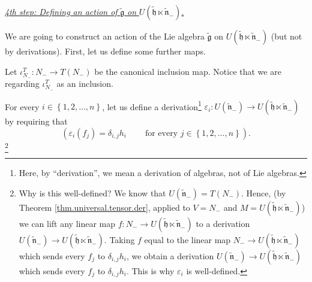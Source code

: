 \documentclass[etingof-lie.tex]{subfiles}
\begin{document}
\bigskip

\underline{\textit{4th step: Defining an action of }$\widetilde{\mathfrak{g}}$
\textit{on }$U\left(  \widetilde{\mathfrak{h}}\ltimes\widetilde{\mathfrak{n}%
}_{-}\right)  $\textit{.}}

We are going to construct an action of the Lie algebra
$\widetilde{\mathfrak{g}}$ on $U\left(  \widetilde{\mathfrak{h}}%
\ltimes\widetilde{\mathfrak{n}}_{-}\right)  $ (but not by derivations). First,
let us define some further maps.

Let $\iota_{N_{-}}^{T}:N_{-}\rightarrow T\left(  N_{-}\right)  $ be the
canonical inclusion map. Notice that we are regarding $\iota_{N_{-}}^{T}$ as
an inclusion.

\begin{vershort}
For every $i\in\left\{  1,2,...,n\right\}  $, let us define a
derivation\footnote{Here, by ``derivation'', we mean a derivation of algebras,
not of Lie algebras.} $\varepsilon_{i}:U\left(  \widetilde{\mathfrak{n}}%
_{-}\right)  \rightarrow U\left(  \widetilde{\mathfrak{h}}\ltimes
\widetilde{\mathfrak{n}}_{-}\right)  $ by requiring that%
\[
\left(  \varepsilon_{i}\left(  f_{j}\right)  =\delta_{i,j}h_{i}%
\ \ \ \ \ \ \ \ \ \ \text{for every }j\in\left\{  1,2,...,n\right\}  \right)
.
\]
\footnote{Why is this well-defined? We know that $U\left(
\widetilde{\mathfrak{n}}_{-}\right)  =T\left(  N_{-}\right)  $. Hence, (by
Theorem \ref{thm.universal.tensor.der}, applied to $V=N_{-}$ and $M=U\left(
\widetilde{\mathfrak{h}}\ltimes\widetilde{\mathfrak{n}}_{-}\right)  $) we can
lift any linear map $f:N_{-}\rightarrow U\left(  \widetilde{\mathfrak{h}%
}\ltimes\widetilde{\mathfrak{n}}_{-}\right)  $ to a derivation $U\left(
\widetilde{\mathfrak{n}}_{-}\right)  \rightarrow U\left(
\widetilde{\mathfrak{h}}\ltimes\widetilde{\mathfrak{n}}_{-}\right)  $. Taking
$f$ equal to the linear map $N_{-}\rightarrow U\left(  \widetilde{\mathfrak{h}%
}\ltimes\widetilde{\mathfrak{n}}_{-}\right)  $ which sends every $f_{j}$ to
$\delta_{i,j}h_{i}$, we obtain a derivation $U\left(  \widetilde{\mathfrak{n}%
}_{-}\right)  \rightarrow U\left(  \widetilde{\mathfrak{h}}\ltimes
\widetilde{\mathfrak{n}}_{-}\right)  $ which sends every $f_{j}$ to
$\delta_{i,j}h_{i}$. This is why $\varepsilon_{i}$ is well-defined.}
\end{vershort}
\end{document}
